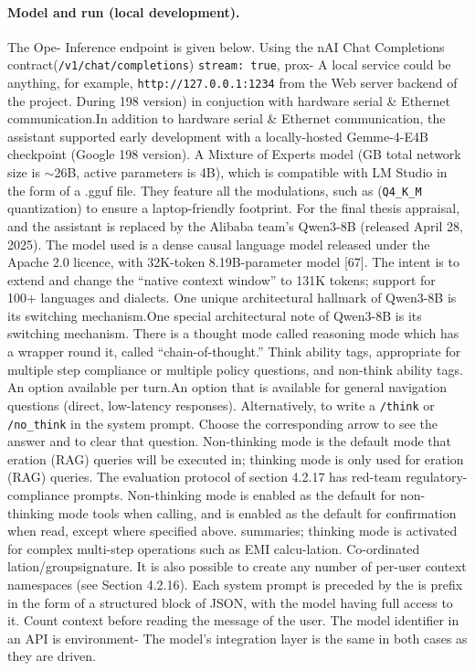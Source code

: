 \documentclass[12pt,a4paper]{article}
\begin{document}
\paragraph{Model and run (local development).}
The Ope- Inference endpoint is given below. Using the nAI Chat Completions contract(\texttt{/v1/chat/completions}) \texttt{stream: true}, prox- A local service could be anything, for example, \texttt{http://127.0.0.1:1234} from the Web server backend of the project. During 198 version) in conjuction with hardware serial \& Ethernet communication.In addition to hardware serial \& Ethernet communication, the assistant supported early development with a locally-hosted Gemme-4-E4B checkpoint (Google 198 version). A Mixture of Experts model (GB total network size is $\sim$26B, active parameters is 4B), which is compatible with LM Studio in the form of a .gguf file. They feature all the modulations, such as (\texttt{Q4\_K\_M} quantization) to ensure a laptop-friendly footprint. For the final thesis appraisal, and the assistant is replaced by the Alibaba team's Qwen3-8B (released April 28, 2025). The model used is a dense causal language model released under the Apache 2.0 licence, with 32K-token 8.19B-parameter model [67]. The intent is to extend and change the ``native context window'' to 131K tokens; support for 100+ languages and dialects. One unique architectural hallmark of Qwen3-8B is its switching mechanism.One special architectural note of Qwen3-8B is its switching mechanism. There is a thought mode called reasoning mode which has a wrapper round it, called ``chain-of-thought.'' Think ability tags, appropriate for multiple step compliance or multiple policy questions, and non-think ability tags. An option available per turn.An option that is available for general navigation questions (direct, low-latency responses). Alternatively, to write a \texttt{/think} or \texttt{/no\_think} in the system prompt. Choose the corresponding arrow to see the answer and to clear that question. Non-thinking mode is the default mode that eration (RAG) queries will be executed in; thinking mode is only used for eration (RAG) queries. The evaluation protocol of section 4.2.17 has red-team regulatory-compliance prompts. Non-thinking mode is enabled as the default for non-thinking mode tools when calling, and is enabled as the default for confirmation when read, except where specified above. summaries; thinking mode is activated for complex multi-step operations such as EMI calcu-lation. Co-ordinated lation/groupsignature. It is also possible to create any number of per-user context namespaces (see Section 4.2.16). Each system prompt is preceded by the is prefix in the form of a structured block of JSON, with the model having full access to it. Count context before reading the message of the user. The model identifier in an API is environment- The model's integration layer is the same in both cases as they are driven.
\end{document}
